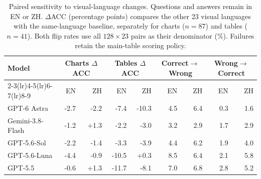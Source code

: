 \begin{table}[t]
\centering
\scriptsize
\begin{tabular*}{\textwidth}{@{\extracolsep{\fill}}lrrrrrrrr@{}}
\toprule
\multirow{2}{*}{Model} & \multicolumn{2}{c}{Charts $\Delta$ACC} & \multicolumn{2}{c}{Tables $\Delta$ACC} & \multicolumn{2}{c}{Correct$\to$Wrong} & \multicolumn{2}{c}{Wrong$\to$Correct} \\
\cmidrule(lr){2-3}\cmidrule(lr){4-5}\cmidrule(lr){6-7}\cmidrule(lr){8-9}
& EN & ZH & EN & ZH & EN & ZH & EN & ZH \\
\midrule
GPT-6 Astra & -2.7 & -2.2 & -7.4 & -10.3 & 4.5 & 6.4 & 0.3 & 1.6 \\
Gemini-3.8-Flash & -1.2 & +1.3 & -2.2 & -3.0 & 3.2 & 2.9 & 1.7 & 2.9 \\
GPT-5.6-Sol & -2.2 & -1.4 & -3.3 & -3.9 & 4.4 & 6.2 & 1.9 & 4.0 \\
GPT-5.6-Luna & -4.4 & -0.9 & -10.5 & +0.3 & 8.5 & 6.4 & 2.1 & 5.8 \\
GPT-5.5 & -0.6 & +1.3 & -11.7 & -8.1 & 7.0 & 6.8 & 2.8 & 5.2 \\
\bottomrule
\end{tabular*}
\caption{Paired sensitivity to visual-language changes. Questions and answers remain in EN or ZH. $\Delta$ACC (percentage points) compares the other 23 visual languages with the same-language baseline, separately for charts ($n=87$) and tables ($n=41$). Both flip rates use all $128\times23$ pairs as their denominator (\%). Failures retain the main-table scoring policy.}
\label{tab:paired-language-sensitivity}
\end{table}
